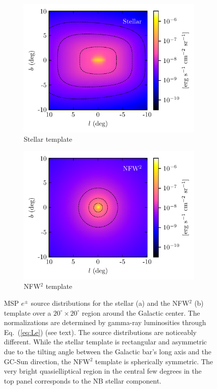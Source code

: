 \documentclass[doublespace,nopageskip]{VTthesis} %
\begin{document}
\begin{figure}[htb]
	\centering
	\begin{subfigure}[h]{0.45\textwidth}
		\centering
		\includegraphics[width=\textwidth]{Figures/IC_MSPs/injection_skymap_bulge.pdf}
		\caption{Stellar template}
		\label{sfig:first_subfig}
	\end{subfigure}
	\begin{subfigure}[h]{0.45\textwidth}
		\centering
		\includegraphics[width=\textwidth]{Figures/IC_MSPs/injection_skymap_nfw.pdf}
		\caption{NFW$^2$ template}
		\label{sfig:second_subfig}
	\end{subfigure}
	\caption{MSP $e^\pm$ source distributions for the stellar (a) and the NFW$^2$ (b) template over a $20^\circ \times 20^\circ$ region around the Galactic center. The normalizations are determined by gamma-ray luminosities through Eq.~(\ref{eq:Le}) (see text). The source distributions are noticeably different. While the stellar template is rectangular and asymmetric due to the tilting angle between the Galactic bar's long axis and the GC-Sun direction, the NFW$^2$ template is spherically symmetric. The very bright quasielliptical region in the central few degrees in the top panel corresponds to the NB stellar component.}
	\label{fig:injection_skymap}
\end{figure}
\end{document}
